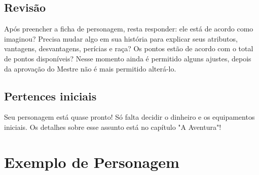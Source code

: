 \subsection{Revisão}

Após preencher a ficha de personagem, resta responder: ele está de acordo como imaginou? Precisa mudar algo em sua história para explicar seus atributos, vantagens, desvantagens, perícias e raça? Os pontos estão de acordo com o total de pontos disponíveis? Nesse momento ainda é permitido alguns ajustes, depois da aprovação do Mestre não é mais permitido alterá-lo.

\subsection{Pertences iniciais}

Seu personagem está quase pronto! Só falta decidir o dinheiro e os equipamentos iniciais. Os detalhes sobre esse assunto está no capítulo "A Aventura"!  

\section{Exemplo de Personagem}





